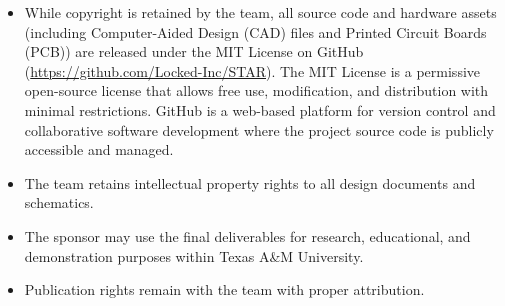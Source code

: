 \begin{itemize}
    \item While copyright is retained by the team, all source code and hardware assets (including Computer-Aided Design (CAD) files and Printed Circuit Boards (PCB)) are released under the MIT License \parencite{mit_license} on GitHub \parencite{github_platform} (\href{https://github.com/Locked-Inc/STAR}{https://github.com/Locked-Inc/STAR}). The MIT License is a permissive open-source license that allows free use, modification, and distribution with minimal restrictions. GitHub is a web-based platform for version control and collaborative software development where the project source code is publicly accessible and managed.
    \item The team retains intellectual property rights to all design documents and schematics.
    \item The sponsor may use the final deliverables for research, educational, and demonstration purposes within Texas A\&M University.
    \item Publication rights remain with the team with proper attribution.
\end{itemize}
